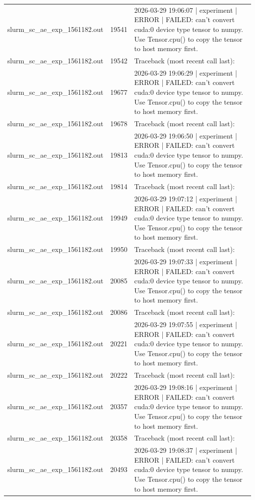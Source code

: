 \begin{tabular}{lrl}
slurm\_sc\_ae\_exp\_1561182.out & 19541 & 2026-03-29 19:06:07 | experiment | ERROR |   FAILED: can't convert cuda:0 device type tensor to numpy. Use Tensor.cpu() to copy the tensor to host memory first. \\
slurm\_sc\_ae\_exp\_1561182.out & 19542 & Traceback (most recent call last): \\
slurm\_sc\_ae\_exp\_1561182.out & 19677 & 2026-03-29 19:06:29 | experiment | ERROR |   FAILED: can't convert cuda:0 device type tensor to numpy. Use Tensor.cpu() to copy the tensor to host memory first. \\
slurm\_sc\_ae\_exp\_1561182.out & 19678 & Traceback (most recent call last): \\
slurm\_sc\_ae\_exp\_1561182.out & 19813 & 2026-03-29 19:06:50 | experiment | ERROR |   FAILED: can't convert cuda:0 device type tensor to numpy. Use Tensor.cpu() to copy the tensor to host memory first. \\
slurm\_sc\_ae\_exp\_1561182.out & 19814 & Traceback (most recent call last): \\
slurm\_sc\_ae\_exp\_1561182.out & 19949 & 2026-03-29 19:07:12 | experiment | ERROR |   FAILED: can't convert cuda:0 device type tensor to numpy. Use Tensor.cpu() to copy the tensor to host memory first. \\
slurm\_sc\_ae\_exp\_1561182.out & 19950 & Traceback (most recent call last): \\
slurm\_sc\_ae\_exp\_1561182.out & 20085 & 2026-03-29 19:07:33 | experiment | ERROR |   FAILED: can't convert cuda:0 device type tensor to numpy. Use Tensor.cpu() to copy the tensor to host memory first. \\
slurm\_sc\_ae\_exp\_1561182.out & 20086 & Traceback (most recent call last): \\
slurm\_sc\_ae\_exp\_1561182.out & 20221 & 2026-03-29 19:07:55 | experiment | ERROR |   FAILED: can't convert cuda:0 device type tensor to numpy. Use Tensor.cpu() to copy the tensor to host memory first. \\
slurm\_sc\_ae\_exp\_1561182.out & 20222 & Traceback (most recent call last): \\
slurm\_sc\_ae\_exp\_1561182.out & 20357 & 2026-03-29 19:08:16 | experiment | ERROR |   FAILED: can't convert cuda:0 device type tensor to numpy. Use Tensor.cpu() to copy the tensor to host memory first. \\
slurm\_sc\_ae\_exp\_1561182.out & 20358 & Traceback (most recent call last): \\
slurm\_sc\_ae\_exp\_1561182.out & 20493 & 2026-03-29 19:08:37 | experiment | ERROR |   FAILED: can't convert cuda:0 device type tensor to numpy. Use Tensor.cpu() to copy the tensor to host memory first. \\

\end{tabular}
